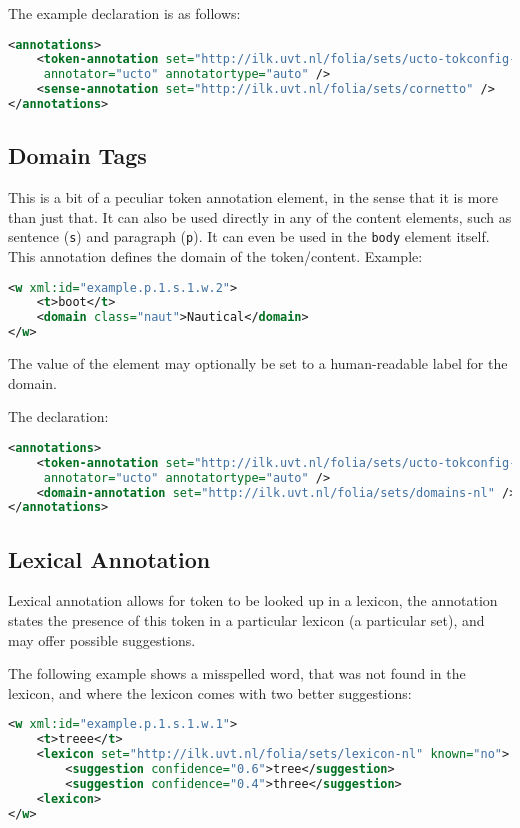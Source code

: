\documentclass[a4paper,12pt]{report}
\begin{document}
The example declaration is as follows:

\begin{lstlisting}[language=xml]
<annotations>
    <token-annotation set="http://ilk.uvt.nl/folia/sets/ucto-tokconfig-nl"
     annotator="ucto" annotatortype="auto" />
    <sense-annotation set="http://ilk.uvt.nl/folia/sets/cornetto" />
</annotations>
\end{lstlisting}

\subsection{Domain Tags}

This is a bit of a peculiar token annotation element, in the sense that it is more than just that. It can also be used directly in any of the content elements, such as sentence (\texttt{s}) and  paragraph (\texttt{p}). It can even be used in the \texttt{body} element itself. This annotation defines the domain of the token/content. Example:

\begin{lstlisting}[language=xml]
<w xml:id="example.p.1.s.1.w.2">
    <t>boot</t>
    <domain class="naut">Nautical</domain>
</w>
\end{lstlisting}

The value of the element may optionally be set to a human-readable label for the domain.

The declaration:

\begin{lstlisting}[language=xml]
<annotations>
    <token-annotation set="http://ilk.uvt.nl/folia/sets/ucto-tokconfig-nl"
     annotator="ucto" annotatortype="auto" />
    <domain-annotation set="http://ilk.uvt.nl/folia/sets/domains-nl" />
</annotations>
\end{lstlisting}

\subsection{Lexical Annotation}

Lexical annotation allows for token to be looked up in a lexicon, the annotation states the presence of this token in a particular lexicon (a particular set), and may offer possible suggestions.

The following example shows a misspelled word, that was not found in the lexicon, and where the lexicon comes with two better suggestions:


\begin{lstlisting}[language=xml]
<w xml:id="example.p.1.s.1.w.1">
    <t>treee</t>
    <lexicon set="http://ilk.uvt.nl/folia/sets/lexicon-nl" known="no">
        <suggestion confidence="0.6">tree</suggestion>
        <suggestion confidence="0.4">three</suggestion>
    <lexicon>
</w>
\end{lstlisting}
\end{document}
